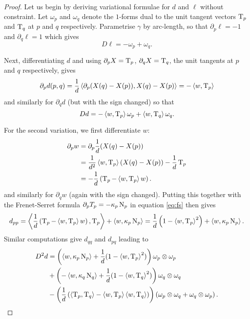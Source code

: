 \documentclass[a4paper, 12pt]{amsart}
\begin{document}
\begin{proof}
Let us begin by deriving variational formulae for $d$ and $\ell$ without constraint. Let $\omega_p$ and $\omega_q$ denote the $1$-forms dual to the unit tangent vectors $\operatorname{T}_p$ and $\operatorname{T}_q$ at $p$ and $q$ respectively. Parametrise $\gamma$ by arc-length, so that $\partial_p \ell = - 1$ and $\partial_q \ell = 1$ which gives 
\begin{equation}
\label{eq:l_first_var}
D\ell = -\omega_p + \omega_q.
\end{equation}

Next, differentiating $d$ and using $\partial_pX = \operatorname{T}_p$, $\partial_qX = \operatorname{T}_q$, the unit tangents at $p$ and $q$ respectively, gives
\[
\partial_p d (p, q) = \frac{1}{d} \left\langle \partial_p(X(q) - X(p)),X(q) - X(p) \right\rangle = -\left\langle w,\operatorname{T}_p \right\rangle
\]
and similarly for $\partial_q d$ (but with the sign changed) so that
\begin{equation}
\label{eq:d_first_var}
Dd = -\left\langle w,\operatorname{T}_p \right\rangle \omega_p + \left\langle w,\operatorname{T}_q \right\rangle \omega_q.
\end{equation}

For the second variation, we first differentiate $w$:
\[
\begin{split}
\partial_p w &= \partial_p \frac{1}{d} (X(q) - X(p)) \\
&= \frac{1}{d^2} \left\langle w,\operatorname{T}_p \right\rangle (X(q) - X(p)) - \frac{1}{d} \operatorname{T}_p \\
&= -\frac{1}{d}\left(\operatorname{T}_p - \left\langle w,\operatorname{T}_p \right\rangle w\right).
\end{split}
\]
and similarly for $\partial_q w$ (again with the sign changed).  Putting this together with the Frenet-Serret formula $\partial_p T_p = -\kappa_p \operatorname{N}_p$ in equation \eqref{eq:fs} then gives
\[
d_{pp} = \left\langle \frac{1}{d}\left(\operatorname{T}_p - \left\langle w,\operatorname{T}_p \right\rangle w\right),\operatorname{T}_p \right\rangle + \left\langle w,\kappa_p \operatorname{N}_p \right\rangle = \frac{1}{d}\left(1 - \left\langle w,\operatorname{T}_p \right\rangle^2\right) + \left\langle w,\kappa_p \operatorname{N}_p \right\rangle.
\]
Similar computations give $d_{qq}$ and $d_{pq}$ leading to
\begin{equation}
\label{eq:d_second_var}
\begin{split}
D^2d &= \left(\left\langle w,\kappa_p \operatorname{N}_p \right\rangle + \frac{1}{d}(1 - \left\langle w,\operatorname{T}_p \right\rangle^2) \right) \omega_p \otimes \omega_p \\
&+ \left(-\left\langle w,\kappa_q \operatorname{N}_q \right\rangle + \frac{1}{d}(1 - \left\langle w,\operatorname{T}_q \right\rangle^2) \right) \omega_q \otimes \omega_q \\
&- \left(\frac{1}{d}\left(\left\langle \operatorname{T}_p,\operatorname{T}_q \right\rangle - \left\langle w,\operatorname{T}_p \right\rangle\left\langle w,\operatorname{T}_q \right\rangle\right) \right) \left(\omega_p \otimes \omega_q + \omega_q \otimes \omega_p\right).
\end{split}
\end{equation}


\end{proof}
\end{document}
